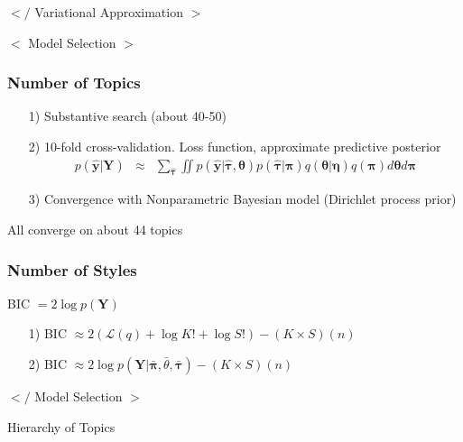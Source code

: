 \documentclass{beamer}
\numberwithin{equation}{section}
\begin{document}
\begin{frame}
$</$ Variational Approximation $>$
\end{frame}

\begin{frame}

$<$ Model Selection $>$
\end{frame}

\begin{frame}
\frametitle{Number of Topics}
\begin{enumerate}
\item[1)] Substantive search (about 40-50)
\item[2)] 10-fold cross-validation.  Loss function, approximate predictive
posterior
\begin{eqnarray}
p(\hat{\boldsymbol{y}}| \boldsymbol{Y}) & \approx &
\sum_{\widehat{\boldsymbol{\tau}}} \iint p(\hat{\boldsymbol{y}}|
\hat{\boldsymbol{\tau}}, \boldsymbol{\theta})
p(\hat{\boldsymbol{\tau}}|\boldsymbol{\pi})
q(\boldsymbol{\theta}|\boldsymbol{\eta}) q(\boldsymbol{\pi})
d\boldsymbol{\theta} d\boldsymbol{\pi} \nonumber
\end{eqnarray}

\item[3)] Convergence with Nonparametric Bayesian model (Dirichlet
process prior)
\end{enumerate}

\Large All converge on about 44 topics


\end{frame}


\begin{frame}
\frametitle{Number of Styles}

BIC $= 2 \log p(\boldsymbol{Y})$

\begin{itemize}
\item[1)] BIC $\approx 2 (\mathcal{L}(q) + \log K! + \log S!) - (K \times
S)(n)$
\item[2)] BIC $ \approx 2 \log p(\boldsymbol{Y}|\bar{\boldsymbol{\pi}},\bar{\theta},\bar{\boldsymbol{\tau}} ) - (K \times
S)(n)$
\end{itemize}

\end{frame}

\begin{frame}

$</$ Model Selection $>$
\end{frame}



\begin{frame}

Hierarchy of Topics

\end{frame}
\end{document}
